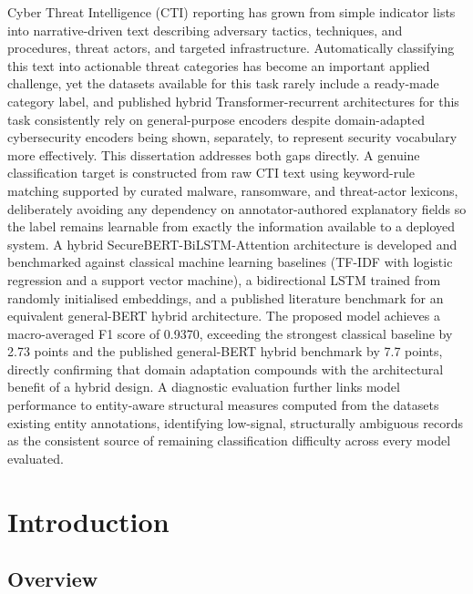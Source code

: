 \documentclass[12pt,a4paper]{report}
\begin{document}
Cyber Threat Intelligence (CTI) reporting has grown from simple
indicator lists into narrative-driven text describing adversary tactics,
techniques, and procedures, threat actors, and targeted infrastructure.
Automatically classifying this text into actionable threat categories
has become an important applied challenge, yet the datasets available
for this task rarely include a ready-made category label, and published
hybrid Transformer-recurrent architectures for this task consistently
rely on general-purpose encoders despite domain-adapted cybersecurity
encoders being shown, separately, to represent security vocabulary more
effectively. This dissertation addresses both gaps directly. A genuine
classification target is constructed from raw CTI text using
keyword-rule matching supported by curated malware, ransomware, and
threat-actor lexicons, deliberately avoiding any dependency on
annotator-authored explanatory fields so the label remains learnable
from exactly the information available to a deployed system. A hybrid
SecureBERT-BiLSTM-Attention architecture is developed and benchmarked
against classical machine learning baselines (TF-IDF with logistic
regression and a support vector machine), a bidirectional LSTM trained
from randomly initialised embeddings, and a published literature
benchmark for an equivalent general-BERT hybrid architecture. The
proposed model achieves a macro-averaged F1 score of 0.9370, exceeding
the strongest classical baseline by 2.73 points and the published
general-BERT hybrid benchmark by 7.7 points, directly confirming that
domain adaptation compounds with the architectural benefit of a hybrid
design. A diagnostic evaluation further links model performance to
entity-aware structural measures computed from the
dataset\textquotesingle s existing entity annotations, identifying
low-signal, structurally ambiguous records as the consistent source of
remaining classification difficulty across every model evaluated.
\chapter{Introduction}

\protect{}\label{_Toc239502922}{}\section{Overview}
\end{document}
